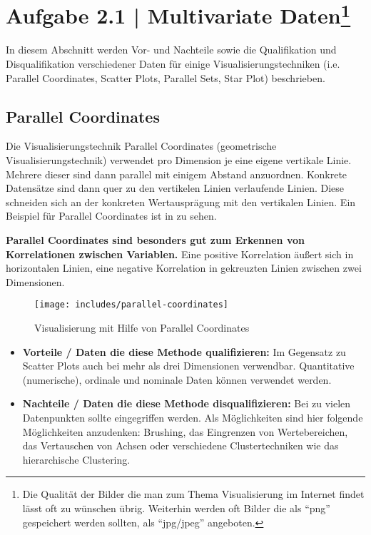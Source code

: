 \documentclass[a4paper,12pt,ngerman]{scrartcl}
\begin{document}
\pagestyle{fancy} %

\section{Aufgabe 2.1 | Multivariate Daten\footnote{\scriptsize{Die Qualität der Bilder die man zum Thema Visualisierung im Internet findet lässt oft zu wünschen übrig. Weiterhin werden oft Bilder die als \enquote{png} gespeichert werden sollten, als \enquote{jpg/jpeg} angeboten.}}}
In diesem Abschnitt werden Vor- und Nachteile sowie die Qualifikation und Disqualifikation verschiedener Daten für einige Visualisierungstechniken (i.e. Parallel Coordinates, Scatter Plots, Parallel Sets, Star Plot) beschrieben.

\subsection*{Parallel Coordinates}
Die Visualisierungstechnik Parallel Coordinates (geometrische Visualisierungstechnik) verwendet pro Dimension je eine eigene vertikale Linie. Mehrere dieser sind dann parallel mit einigem Abstand anzuordnen. Konkrete Datensätze sind dann quer zu den vertikelen Linien verlaufende Linien. Diese schneiden sich an der konkreten Wertausprägung mit den vertikalen Linien. Ein Beispiel für Parallel Coordinates ist in  zu sehen.

\textbf{Parallel Coordinates sind besonders gut zum Erkennen von Korrelationen zwischen Variablen.} Eine positive Korrelation äußert sich in horizontalen Linien, eine negative Korrelation in gekreuzten Linien zwischen zwei Dimensionen.

\begin{figure}[ht]
    \centering
    \texttt{[image: includes/parallel-coordinates]}
    \caption{Visualisierung mit Hilfe von Parallel Coordinates}
    \label{fig:parallel-coordinates}
\end{figure}

\begin{itemize}
	\item \textbf{Vorteile / Daten die diese Methode qualifizieren:}
	Im Gegensatz zu Scatter Plots auch bei mehr als drei Dimensionen verwendbar. Quantitative (numerische), ordinale und nominale Daten können verwendet werden.

	\item \textbf{Nachteile / Daten die diese Methode disqualifizieren:}
	Bei zu vielen Datenpunkten sollte eingegriffen werden. Als Möglichkeiten sind hier folgende Möglichkeiten anzudenken: Brushing, das Eingrenzen von Wertebereichen, das Vertauschen von Achsen oder verschiedene Clustertechniken wie das hierarchische Clustering.
\end{itemize}
\end{document}
